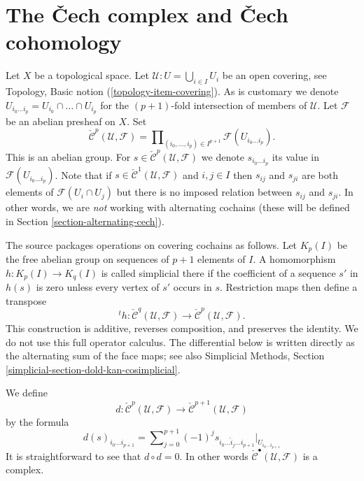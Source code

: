 \section{The {\v C}ech complex and {\v C}ech cohomology}
\label{section-cech}

\noindent
Let $X$ be a topological space.
Let $\mathcal{U} : U = \bigcup_{i \in I} U_i$ be an open covering,
see Topology, Basic notion (\ref{topology-item-covering}).
As is customary we denote
$U_{i_0\ldots i_p} = U_{i_0} \cap \ldots \cap U_{i_p}$ for the
$(p + 1)$-fold intersection of members of $\mathcal{U}$.
Let $\mathcal{F}$ be an abelian presheaf on $X$.
Set
$$
\check{\mathcal{C}}^p(\mathcal{U}, \mathcal{F})
=
\prod\nolimits_{(i_0, \ldots, i_p) \in I^{p + 1}}
\mathcal{F}(U_{i_0\ldots i_p}).
$$
This is an abelian group. For
$s \in \check{\mathcal{C}}^p(\mathcal{U}, \mathcal{F})$ we denote
$s_{i_0\ldots i_p}$ its value in $\mathcal{F}(U_{i_0\ldots i_p})$.
Note that if $s \in \check{\mathcal{C}}^1(\mathcal{U}, \mathcal{F})$
and $i, j \in I$ then $s_{ij}$ and $s_{ji}$ are both elements
of $\mathcal{F}(U_i \cap U_j)$ but there is no imposed
relation between $s_{ij}$ and $s_{ji}$. In other words, we are {\it not}
working with alternating cochains (these will be defined
in Section \ref{section-alternating-cech}).

\begin{remark}
\label{remark-FAC-simplicial-operators}
\begin{reference}
\cite[Chapter I, \S 3, no. 19, pp. 212--213]{FAC}
\end{reference}
The source packages operations on covering cochains as follows. Let
$K_p(I)$ be the free abelian group on sequences of $p + 1$ elements of
$I$. A homomorphism $h : K_p(I) \to K_q(I)$ is called simplicial there
if the coefficient of a sequence $s'$ in $h(s)$ is zero unless every
vertex of $s'$ occurs in $s$. Restriction maps then define a transpose
$$
{}^t h :
\check{\mathcal{C}}^q(\mathcal{U}, \mathcal{F})
\longrightarrow
\check{\mathcal{C}}^p(\mathcal{U}, \mathcal{F}).
$$
This construction is additive, reverses composition, and preserves the
identity. We do not use this full operator calculus. The differential
below is written directly as the alternating sum of the face maps; see
also Simplicial Methods, Section
\ref{simplicial-section-dold-kan-cosimplicial}.
\end{remark}

We define
$$
d : \check{\mathcal{C}}^p(\mathcal{U}, \mathcal{F})
\longrightarrow
\check{\mathcal{C}}^{p + 1}(\mathcal{U}, \mathcal{F})
$$
by the formula
\begin{equation}
\label{equation-d-cech}
d(s)_{i_0\ldots i_{p + 1}}
=
\sum\nolimits_{j = 0}^{p + 1}
(-1)^j
s_{i_0\ldots \hat i_j \ldots i_{p + 1}}|_{U_{i_0\ldots i_{p + 1}}}
\end{equation}
It is straightforward to see that $d \circ d = 0$. In other words
$\check{\mathcal{C}}^\bullet(\mathcal{U}, \mathcal{F})$ is a complex.

